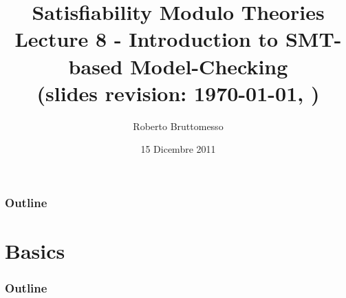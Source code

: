 \documentclass[xcolor=dvipsnames
              ]{beamer}
\title[Intro to MC]{Satisfiability Modulo Theories\\ Lecture 8 - Introduction to SMT-based Model-Checking \\ {\tiny (slides revision: \today, \currenttime)}}
\author[R. Bruttomesso]{\large Roberto Bruttomesso}
\date{15 Dicembre 2011}
\institute[SMT]{\large Seminario di Logica Matematica \\ (Corso Prof. Silvio Ghilardi)}
\begin{document}
\frame{\titlepage}

\begin{frame}
  \frametitle{Outline}
  \tableofcontents
\end{frame}

\section{Basics}





\begin{frame}
  \frametitle{Outline}
  \tableofcontents
\end{frame}

\section{\mcmt}

\end{document}
